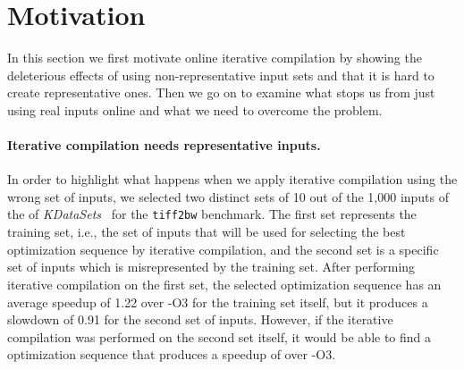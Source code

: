 \section{Motivation \label{sec:motivation}}


    In this section we first motivate online iterative compilation by showing the deleterious effects of using non-representative input
    sets and that it is hard to create representative ones. Then we go on to examine what stops us from just using real inputs online and
    what we need to overcome the problem.

    \paragraph{Iterative compilation needs representative inputs.} 
    In order to highlight what happens when we apply iterative compilation using the wrong set of inputs, we selected two distinct sets of
    10 out of the 1,000 inputs of the of \textit{KDataSets}~\cite{chen10,chen12a} for the \texttt{tiff2bw} benchmark.
    The first set represents the training set, i.e., the set of inputs that will be used for selecting the best optimization sequence by
    iterative compilation, and the second set is a specific set of inputs which is misrepresented by the training set.
    After performing iterative compilation on the first set, the selected optimization sequence has an average speedup of 1.22 over -O3 for
    the training set itself, but it produces a slowdown of 0.91 for the second set of inputs.
    However, if the iterative compilation was performed on the second set itself, it would be able to find a optimization sequence that
    produces a speedup of  over -O3.


